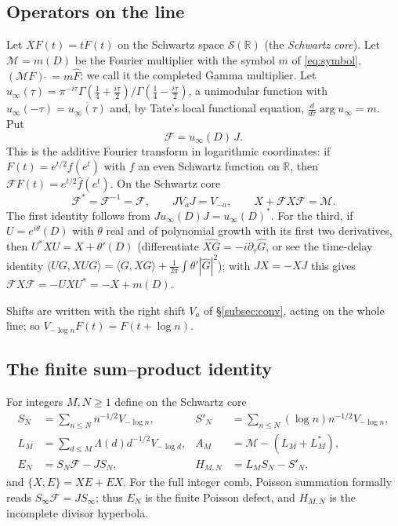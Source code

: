 \documentclass[11pt]{amsart}
\theoremstyle{definition}
\theoremstyle{remark}
\newcommand{\R}{\mathbb R}
\newcommand{\Fh}{\widehat F}
\begin{document}
\subsection{Operators on the line}

Let $XF(t)=tF(t)$ on the Schwartz space $\mathcal S(\R)$ (the \emph{Schwartz
core}). Let $\mathcal M=m(D)$ be the Fourier multiplier with the symbol $m$ of \eqref{eq:symbol},
$(\mathcal MF)\,\widehat{}\,=m\Fh$; we call it the completed Gamma multiplier. Let
$u_\infty(\tau)=\pi^{-i\tau}\Gamma(\frac14+\frac{i\tau}2)/\Gamma(\frac14-\frac{i\tau}2)$, a
unimodular function with $u_\infty(-\tau)=\overline{u_\infty(\tau)}$ and, by Tate's local
functional equation, $\frac{d}{d\tau}\arg u_\infty=m$. Put
\[
 \mathscr F=u_\infty(D)\,J .
\]
This is the additive Fourier transform in logarithmic coordinates: if $F(t)=e^{t/2}f(e^t)$ with $f$
an even Schwartz function on $\R$, then $\mathscr FF(t)=e^{t/2}\widehat f(e^t)$. On the Schwartz
core
\[
 \mathscr F^*=\mathscr F^{-1}=\mathscr F,\qquad
 JV_aJ=V_{-a},\qquad X+\mathscr FX\mathscr F=\mathcal M .
\]
The first identity follows from $Ju_\infty(D)J=u_\infty(D)^*$. For the third, if $U=e^{i\theta}(D)$
with $\theta$ real and of polynomial growth with its first two derivatives, then
$U^*XU=X+\theta'(D)$ (differentiate $\widehat{XG}=-i\partial_\tau\widehat G$, or see the time-delay
identity $\langle UG,XUG\rangle=\langle G,XG\rangle+\frac1{2\pi}\int\theta'|\widehat G|^2$); with
$JX=-XJ$ this gives $\mathscr FX\mathscr F=-UXU^*=-X+m(D)$.

Shifts are written with the right shift $V_a$ of \S\ref{subsec:conv}, acting on the whole line; so
$V_{-\log n}F(t)=F(t+\log n)$.

\subsection{The finite sum--product identity}

For integers $M,N\ge1$ define on the Schwartz core
\begin{align*}
 S_N&=\sum_{n\le N}n^{-1/2}V_{-\log n},&
 S'_N&=\sum_{n\le N}(\log n)n^{-1/2}V_{-\log n},\\
 L_M&=\sum_{d\le M}\Lambda(d)d^{-1/2}V_{-\log d},&
 A_M&=\mathcal M-(L_M+L_M^*),\\
 E_N&=S_N\mathscr F-JS_N,&
 H_{M,N}&=L_MS_N-S'_N,
\end{align*}
and $\{X,E\}=XE+EX$. For the full integer comb, Poisson summation formally reads
$S_\infty\mathscr F=JS_\infty$; thus $E_N$ is the finite Poisson defect, and $H_{M,N}$ is the
incomplete divisor hyperbola.
\end{document}
